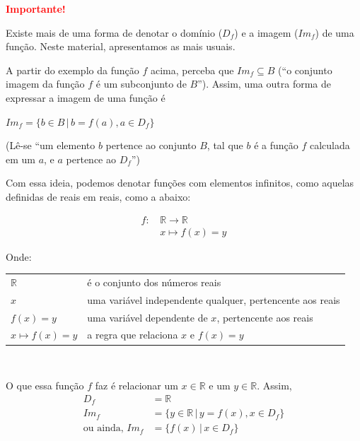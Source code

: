 \documentclass[12pt,openright,twoside,a4paper]{article}
\makeatletter
\theoremstyle{definition}
\newenvironment{condicoes}[1][Onde:]
{#1 \begin{tabular}[t]{>{$}l<{$} @{${} \implies {}$} l}}
	{\end{tabular}\\[\belowdisplayskip]}
\makeatother
\begin{document}
	\begin{snugshade}
		\textbf{\textcolor{red}{Importante!}}
		
		Existe mais de uma forma de denotar o domínio ($D_f$) e a imagem ($Im_f$) de uma função. Neste material, apresentamos as mais usuais.
		
		A partir do exemplo da função $f$ acima, perceba que $Im_f \subseteq B$ (``o conjunto imagem da função $f$ é um subconjunto de $B$''). Assim, uma outra forma de expressar a imagem de uma função é
		
		\begin{center}
			$Im_f = \{b \in B \,|\, b = f(a), a \in D_f\}$
			
			(Lê-se ``um elemento $b$ pertence ao conjunto $B$, tal que $b$ é a função $f$ calculada em um $a$, e $a$ pertence ao $D_f$'')
		\end{center}
		
		Com essa ideia, podemos denotar funções com elementos infinitos, como aquelas definidas de reais em reais, como a abaixo:
		
		\begin{align*}
			f:\, &\mathbb{R} \longrightarrow \mathbb{R}\\
			&x \mapsto f(x) = y
		\end{align*}
		
		
		\begin{condicoes}
			\mathbb{R} & é o conjunto dos números reais\\
			x & uma variável independente qualquer, pertencente aos reais\\
			f(x) = y & uma variável dependente de $x$, pertencente aos reais\\
			x \mapsto f(x) = y & a regra que relaciona $x$ e $f(x) = y$
		\end{condicoes}
		
		O que essa função $f$ faz é relacionar um $x \in \mathbb{R}$ e um $y \in \mathbb{R}$. Assim,
		\begin{align*}
			D_f &= \mathbb{R}\\
			Im_f &= \{y \in \mathbb{R} \,|\, y = f(x), x \in D_f\}\\
			\text{ou ainda, } Im_f &= \{f(x) \,|\, x \in D_f\}
		\end{align*}
		
	\end{snugshade}
	
\end{document}
